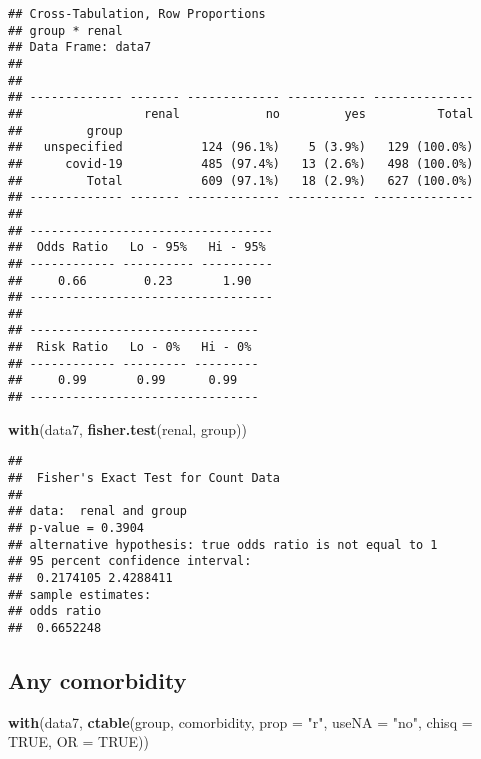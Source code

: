 \documentclass[
]{article}
\newenvironment{Shaded}{\begin{snugshade}}{\end{snugshade}}
\newcommand{\DataTypeTok}[1]{\textcolor[rgb]{0.13,0.29,0.53}{#1}}
\newcommand{\KeywordTok}[1]{\textcolor[rgb]{0.13,0.29,0.53}{\textbf{#1}}}
\newcommand{\NormalTok}[1]{#1}
\newcommand{\OtherTok}[1]{\textcolor[rgb]{0.56,0.35,0.01}{#1}}
\newcommand{\StringTok}[1]{\textcolor[rgb]{0.31,0.60,0.02}{#1}}
\begin{document}
\begin{verbatim}
## Cross-Tabulation, Row Proportions  
## group * renal  
## Data Frame: data7  
## 
## 
## ------------- ------- ------------- ----------- --------------
##                 renal            no         yes          Total
##         group                                                 
##   unspecified           124 (96.1%)    5 (3.9%)   129 (100.0%)
##      covid-19           485 (97.4%)   13 (2.6%)   498 (100.0%)
##         Total           609 (97.1%)   18 (2.9%)   627 (100.0%)
## ------------- ------- ------------- ----------- --------------
## 
## ----------------------------------
##  Odds Ratio   Lo - 95%   Hi - 95% 
## ------------ ---------- ----------
##     0.66        0.23       1.90   
## ----------------------------------
## 
## --------------------------------
##  Risk Ratio   Lo - 0%   Hi - 0% 
## ------------ --------- ---------
##     0.99       0.99      0.99   
## --------------------------------
\end{verbatim}

\begin{Shaded}
\begin{Highlighting}[]
\KeywordTok{with}\NormalTok{(data7, }\KeywordTok{fisher.test}\NormalTok{(renal, group))}
\end{Highlighting}
\end{Shaded}

\begin{verbatim}
## 
##  Fisher's Exact Test for Count Data
## 
## data:  renal and group
## p-value = 0.3904
## alternative hypothesis: true odds ratio is not equal to 1
## 95 percent confidence interval:
##  0.2174105 2.4288411
## sample estimates:
## odds ratio 
##  0.6652248
\end{verbatim}

\hypertarget{any-comorbidity}{%
\subsection{Any comorbidity}\label{any-comorbidity}}

\begin{Shaded}
\begin{Highlighting}[]
\KeywordTok{with}\NormalTok{(data7, }\KeywordTok{ctable}\NormalTok{(group, comorbidity, }\DataTypeTok{prop =} \StringTok{"r"}\NormalTok{, }\DataTypeTok{useNA =} \StringTok{"no"}\NormalTok{, }\DataTypeTok{chisq =} \OtherTok{TRUE}\NormalTok{, }\DataTypeTok{OR =} \OtherTok{TRUE}\NormalTok{))}
\end{Highlighting}
\end{Shaded}
\end{document}
